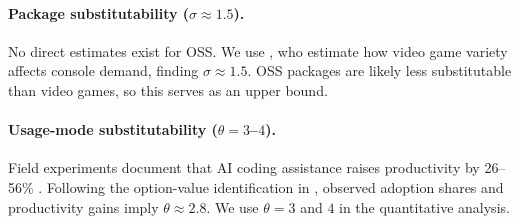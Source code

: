 \documentclass[11pt,a4paper]{article}
\theoremstyle{definition}
\theoremstyle{remark}
\begin{document}
\paragraph{Package substitutability ($\sigma \approx 1.5$).} No direct estimates exist for OSS. We use \citet{clements-ohashi-2005}, who estimate how video game variety affects console demand, finding $\sigma \approx 1.5$. OSS packages are likely less substitutable than video games, so this serves as an upper bound.

\paragraph{Usage-mode substitutability ($\theta = 3$--$4$).} Field experiments document that AI coding assistance raises productivity by 26--56\% \citep{peng-2023-copilot-productivity,cui-demirer-jaffe-musolff-peng-salz-2025}. Following the option-value identification in \citet{halpern-koren-szeidl-2015}, observed adoption shares and productivity gains imply $\theta \approx 2.8$. We use $\theta = 3$ and $4$ in the quantitative analysis. 
\end{document}
